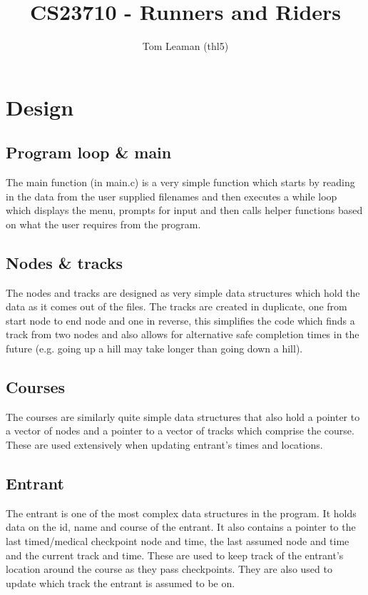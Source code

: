 \documentclass[a4paper, twoside]{article}
\title{CS23710 - Runners and Riders}
\author{Tom Leaman (thl5)}
\begin{document}
\maketitle

\section{Design}
\subsection{Program loop \& main}
The main function (in main.c) is a very simple function which starts by reading
in the data from the user supplied filenames and then executes a while loop
which displays the menu, prompts for input and then calls helper functions
based on what the user requires from the program.

\subsection{Nodes \& tracks}
The nodes and tracks are designed as very simple data structures which hold the
data as it comes out of the files. The tracks are created in duplicate, one
from start node to end node and one in reverse, this simplifies the code which
finds a track from two nodes and also allows for alternative safe completion
times in the future (e.g. going up a hill may take longer than going down a
hill).

\subsection{Courses}
The courses are similarly quite simple data structures that also hold a pointer
to a vector of nodes and a pointer to a vector of tracks which comprise the
course. These are used extensively when updating entrant's times and locations.

\subsection{Entrant}
The entrant is one of the most complex data structures in the program. It holds
data on the id, name and course of the entrant. It also contains a pointer to
the last timed/medical checkpoint node and time, the last assumed node and time
and the current track and time. These are used to keep track of the entrant's
location around the course as they pass checkpoints. They are also used to
update which track the entrant is assumed to be on.
\end{document}
